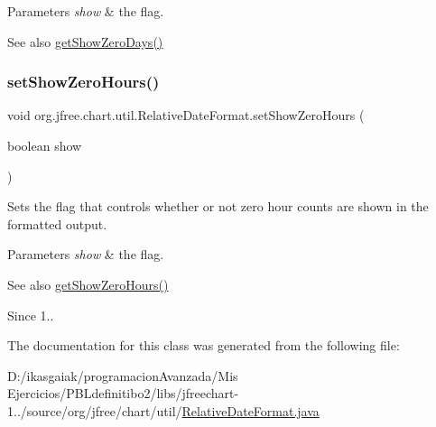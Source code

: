 \begin{DoxyParams}{Parameters}
{\em show} & the flag.\\
\hline
\end{DoxyParams}
\begin{DoxySeeAlso}{See also}
\mbox{\hyperlink{classorg_1_1jfree_1_1chart_1_1util_1_1_relative_date_format_a0df68eae2abaeaad6a30f11c4581ef67}{get\+Show\+Zero\+Days()}} 
\end{DoxySeeAlso}
\mbox{\label{classorg_1_1jfree_1_1chart_1_1util_1_1_relative_date_format_aac19e1c8e60280bae7a59223ac11aee2}} 
\subsubsection{\texorpdfstring{set\+Show\+Zero\+Hours()}{setShowZeroHours()}}
{\footnotesize\ttfamily void org.\+jfree.\+chart.\+util.\+Relative\+Date\+Format.\+set\+Show\+Zero\+Hours (\begin{DoxyParamCaption}\item[{boolean}]{show }\end{DoxyParamCaption})}

Sets the flag that controls whether or not zero hour counts are shown in the formatted output.


\begin{DoxyParams}{Parameters}
{\em show} & the flag.\\
\hline
\end{DoxyParams}
\begin{DoxySeeAlso}{See also}
\mbox{\hyperlink{classorg_1_1jfree_1_1chart_1_1util_1_1_relative_date_format_a0659489a2820c585ca1e30ea7f0f2768}{get\+Show\+Zero\+Hours()}}
\end{DoxySeeAlso}
\begin{DoxySince}{Since}
1.. 
\end{DoxySince}


The documentation for this class was generated from the following file\+:\begin{DoxyCompactItemize}
\item 
D\+:/ikasgaiak/programacion\+Avanzada/\+Mis Ejercicios/\+P\+B\+Ldefinitibo2/libs/jfreechart-\/1../source/org/jfree/chart/util/\mbox{\hyperlink{_relative_date_format_8java}{Relative\+Date\+Format.\+java}}\end{DoxyCompactItemize}
